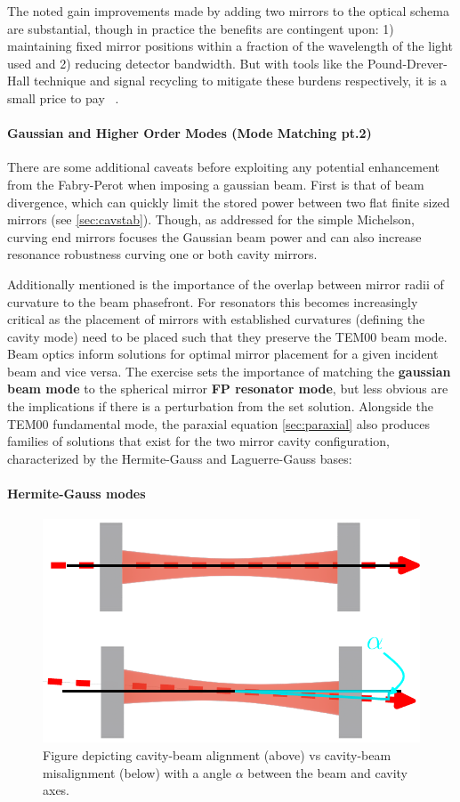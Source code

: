 The noted gain improvements made by adding two mirrors to the optical schema are substantial, though in practice the benefits are contingent upon: 1) maintaining fixed mirror positions within a fraction of the wavelength of the light used and 2) reducing detector bandwidth. But with tools like the Pound-Drever-Hall technique and signal recycling to mitigate these burdens respectively, it is a small price to pay ~\cite{black:pdh}.

\paragraph{Gaussian and Higher Order Modes (Mode Matching pt.2)}\label{subsubsubsubsec:mm2}

There are some additional caveats before exploiting any potential enhancement from the Fabry-Perot when imposing a gaussian beam. First is that of beam divergence, which can quickly limit the stored power between two flat finite sized mirrors (see \autoref{sec:cavstab}). Though, as addressed for the simple Michelson, curving end mirrors focuses the Gaussian beam power and can also increase resonance robustness curving one or both cavity mirrors. 

Additionally mentioned is the importance of the overlap between mirror radii of curvature to the beam phasefront. For resonators this becomes increasingly critical as the placement of mirrors with established curvatures (defining the cavity mode) need to be placed such that they preserve the TEM00 beam mode. Beam optics inform solutions for optimal mirror placement for a given incident beam and vice versa. The exercise sets the importance of matching the \textbf{gaussian beam mode} to the spherical mirror \textbf{FP resonator mode}, but less obvious are the implications if there is a perturbation from the set solution. Alongside the TEM00 fundamental mode, the paraxial equation \autoref{sec:paraxial} also produces families of solutions that exist for the two mirror cavity configuration, characterized by the Hermite-Gauss and Laguerre-Gauss bases:

\paragraph*{Hermite-Gauss modes}

\begin{figure}[H]
	\centering
	\includegraphics[width=.7\textwidth]{figs/INTRO/FP_misalignment.pdf}
	\caption{Figure depicting cavity-beam alignment (above) vs cavity-beam misalignment (below) with a angle $\alpha$ between the beam and cavity axes. }
	\label{fig:fp_misalignment}
\end{figure}

